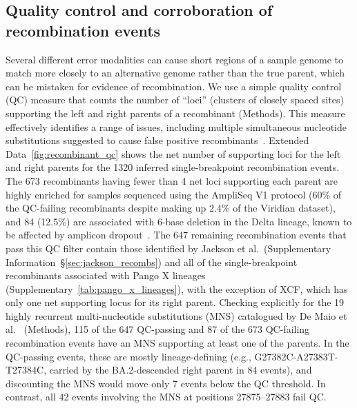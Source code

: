 \documentclass[12pt]{article}
\newcommand{\supref}[1]{Supplementary Information~\S\ref{#1}}
\newcommand{\edref}[1]{Extended Data~\ref{#1}}
\newcommand{\siref}[1]{Supplementary~\ref{#1}}
\begin{document}
\subsection*{Quality control and corroboration of recombination events}
Several different error modalities can cause short regions
of a sample genome to match more closely
to an alternative genome rather than the true parent,
which can be mistaken for evidence of recombination.
We use a simple quality control (QC) measure
that counts the number of ``loci'' (clusters of closely spaced sites)
supporting the left and right parents of a recombinant (Methods).
This measure effectively identifies a range of issues,
including multiple simultaneous nucleotide substitutions
suggested to cause false positive recombinants~\cite{DeMaio2024}.
\edref{fig:recombinant_qc} shows
the net number of supporting loci for the left and right parents
for the 1320 inferred single-breakpoint recombination events.
The 673 recombinants having fewer than 4 net loci supporting each parent
are highly enriched for samples sequenced using the AmpliSeq V1 protocol
(60\% of the QC-failing recombinants
despite making up 2.4\% of the Viridian dataset), and
84 (12.5\%) are associated with 6-base deletion in the Delta lineage,
known to be affected by amplicon dropout~\cite{Sanderson2021}.
The 647 remaining recombination events that pass this QC filter
contain those identified by Jackson et al.\ (\supref{sec:jackson_recombs})
and all of the single-breakpoint recombinants associated with Pango X lineages
(\siref{tab:pango_x_lineages}), with the exception of XCF,
which has only one net supporting locus for its right parent.
Checking explicitly for the 19 highly recurrent
multi-nucleotide substitutions (MNS)
catalogued by De Maio et al.~\cite{DeMaio2024} (Methods),
115 of the 647 QC-passing and 87 of the 673 QC-failing recombination events
have an MNS supporting at least one of the parents.
In the QC-passing events, these are mostly lineage-defining
(e.g., G27382C-A27383T-T27384C,
carried by the BA.2-descended right parent in 84 events),
and discounting the MNS would move only 7 events below the QC threshold.
In contrast, all 42 events involving the MNS at positions 27875--27883 fail QC.
\end{document}
